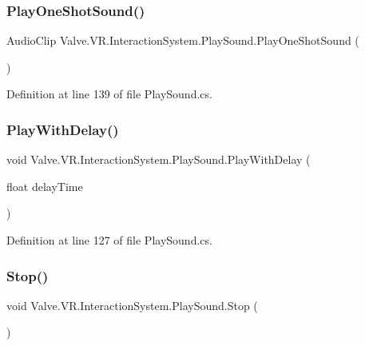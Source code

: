\subsubsection{\texorpdfstring{PlayOneShotSound()}{PlayOneShotSound()}}
{\footnotesize\ttfamily Audio\+Clip Valve.\+V\+R.\+Interaction\+System.\+Play\+Sound.\+Play\+One\+Shot\+Sound (\begin{DoxyParamCaption}{ }\end{DoxyParamCaption})}



Definition at line 139 of file Play\+Sound.\+cs.

\mbox{\label{class_valve_1_1_v_r_1_1_interaction_system_1_1_play_sound_a63a5229219f93d4e2e332ea47e5ba747}} 
\subsubsection{\texorpdfstring{PlayWithDelay()}{PlayWithDelay()}}
{\footnotesize\ttfamily void Valve.\+V\+R.\+Interaction\+System.\+Play\+Sound.\+Play\+With\+Delay (\begin{DoxyParamCaption}\item[{float}]{delay\+Time }\end{DoxyParamCaption})}



Definition at line 127 of file Play\+Sound.\+cs.

\mbox{\label{class_valve_1_1_v_r_1_1_interaction_system_1_1_play_sound_a52ca736a68f31cc3459791070fd5f3f0}} 
\subsubsection{\texorpdfstring{Stop()}{Stop()}}
{\footnotesize\ttfamily void Valve.\+V\+R.\+Interaction\+System.\+Play\+Sound.\+Stop (\begin{DoxyParamCaption}{ }\end{DoxyParamCaption})}



